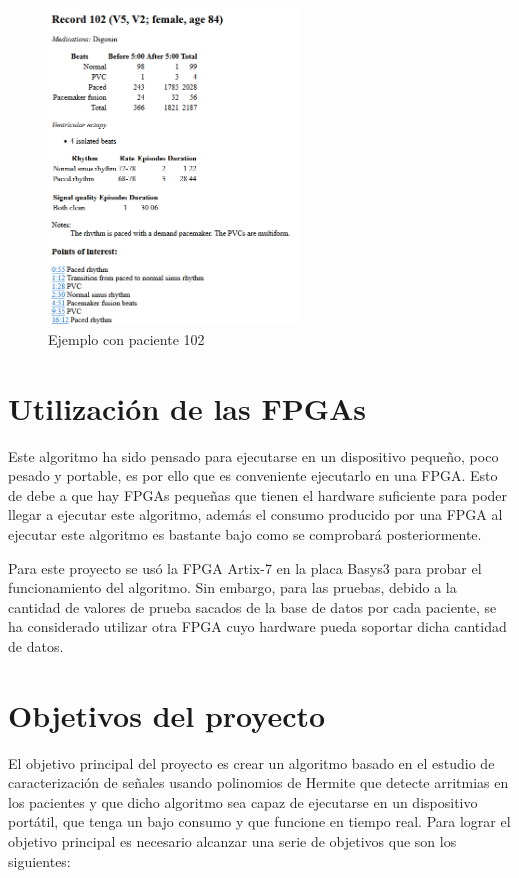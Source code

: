 \begin{figure}[h]
	\centering
	\includegraphics[width=0.6\textwidth]{./Images/img_introduccion/Paciente_pruebas_MIT.png}
	\caption{Ejemplo con paciente 102 \cite{mitdb}}
	\label{fig:Paciente_pruebas_MIT}
\end{figure}

\section{Utilización de las FPGAs}
Este algoritmo ha sido pensado para ejecutarse en un dispositivo pequeño, poco pesado y portable, es por ello que es conveniente ejecutarlo en una FPGA\cite{mdpi_sensors_2014}. Esto de debe a que hay FPGAs pequeñas que tienen el hardware suficiente para poder llegar a ejecutar este algoritmo, además el consumo producido por una FPGA al ejecutar este algoritmo es bastante bajo como se comprobará posteriormente.

Para este proyecto se usó la FPGA Artix-7 \cite{xilinx_artix7} en la placa Basys3 para probar el funcionamiento del algoritmo. Sin embargo, para las pruebas, debido a la cantidad de valores de prueba sacados de la base de datos por cada paciente, se ha considerado utilizar otra FPGA cuyo hardware pueda soportar dicha cantidad de datos.


\section{Objetivos del proyecto}

El objetivo principal del proyecto es crear un algoritmo basado en el estudio de caracterización de señales usando polinomios de Hermite \cite{desai2021low} que detecte arritmias en los pacientes y que dicho algoritmo sea capaz de ejecutarse en un dispositivo portátil, que tenga un bajo consumo y que funcione en tiempo real. Para lograr el objetivo principal es necesario alcanzar una serie de objetivos que son los siguientes:

